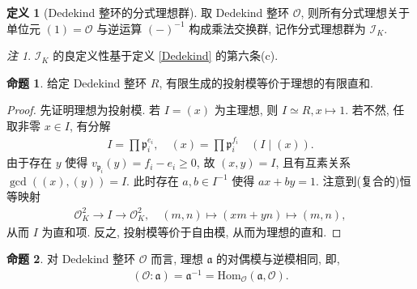 \documentclass{MainStyle}
\theoremstyle{definition}
\theoremstyle{definition}
\theoremstyle{definition}
\newtheorem{definition}{定义}
\theoremstyle{definition}
\newtheorem{proposition}{命题}
\theoremstyle{definition}
\theoremstyle{definition}
\theoremstyle{definition}
\theoremstyle{remark}
\newtheorem{remark}{注}
\theoremstyle{remark}
\begin{document}
\begin{definition}[Dedekind 整环的分式理想群]
    取 Dedekind 整环 $\mathcal O$, 则所有分式理想关于单位元 $(1)=\mathcal O$ 与逆运算 $(-)^{-1}$ 构成乘法交换群, 记作分式理想群为 $\mathcal I_K$.
\end{definition}

\begin{remark}
    $\mathcal I_K$ 的良定义性基于定义 \ref{Dedekind} 的第六条(c).
\end{remark}

\begin{proposition}
    给定 Dedekind 整环 $R$, 有限生成的投射模等价于理想的有限直和.
    \begin{proof}
        先证明理想为投射模. 若 $I=(x)$ 为主理想, 则 $I\simeq R, x\mapsto1$. 若不然, 任取非零 $x\in I$, 有分解
        \begin{align*}
            I= \prod \mathfrak p_i^{e_i},\quad (x)=\prod \mathfrak p_i^{f_i}\quad (I\mid (x)).
        \end{align*}
        由于存在 $y$ 使得 $v_{\mathfrak p_i}(y)=f_i-e_i\geq 0$, 故 $(x,y)=I$, 且有互素关系 $\gcd((x),(y))=I$. 此时存在 $a,b\in I^{-1}$ 使得 $ax+by=1$. 注意到(复合的)恒等映射
        \begin{align*}
            \mathcal O_K^2\to I\to \mathcal O_K^2,\quad (m,n)\mapsto (xm+yn)\mapsto (m,n),
        \end{align*}
        从而 $I$ 为直和项. 反之, 投射模等价于自由模, 从而为理想的直和.
    \end{proof}
\end{proposition}

\begin{proposition}
    对 Dedekind 整环 $\mathcal O$ 而言, 理想 $\mathfrak a$ 的对偶模与逆模相同, 即,
    \begin{align*}
        (\mathcal O:\mathfrak a)=\mathfrak a^{-1}=\mathrm{Hom}_{\mathcal O}(\mathfrak a,\mathcal O).
    \end{align*}
\end{proposition}
\end{document}
